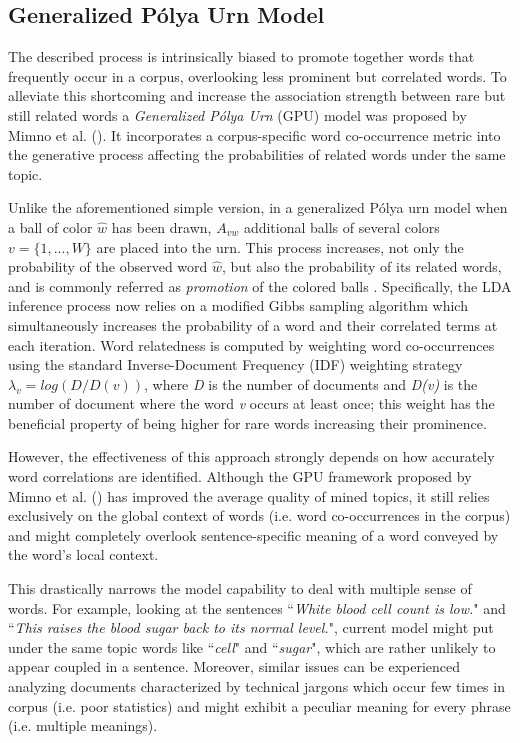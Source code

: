 \documentclass[letterpaper]{article}
\begin{document}
\subsection{Generalized P\'{o}lya Urn Model}
The described process is intrinsically biased to promote together words that frequently occur in a corpus, overlooking less prominent but correlated words. To alleviate this shortcoming and increase the association strength between rare but still related words a \textit{Generalized P\'{o}lya Urn} (GPU) model was proposed by  Mimno et al. (\citeyear{Mimno11}). It incorporates a corpus-specific word co-occurrence metric into the generative process affecting the probabilities of related words under the same topic.

Unlike the aforementioned simple version, in a generalized P\'{o}lya urn model when a ball of color $\hat{w}$ has been drawn, $A_{vw}$ additional balls of several colors $v=\{1,...,W\}$ are placed into the urn. This process increases, not only the probability of the observed word $\hat{w}$, but also the probability of its related words, and is commonly referred as \textit{promotion} of the colored balls \cite{Fei14}.
Specifically, the LDA inference process now relies on a modified Gibbs sampling algorithm which simultaneously increases the probability of a word and their correlated terms at each iteration. Word relatedness is computed by weighting word co-occurrences using the standard Inverse-Document Frequency (IDF) weighting strategy $\lambda_v = log(D/D(v))$, where \textit{D} is the number of documents and \textit{D(v)} is the number of document where the word \textit{v} occurs at least once; this weight has the beneficial property of being higher for rare words increasing their prominence.

However, the effectiveness of this approach strongly depends on how accurately word correlations are identified.
Although the GPU framework proposed by  Mimno et al. (\citeyear{Mimno11}) has improved the average quality of mined topics, it still relies exclusively on the global context of words (i.e. word co-occurrences in the corpus) and might completely overlook sentence-specific meaning of a word conveyed by the word's local context.

This drastically narrows the model capability to deal with multiple sense of words. For example, looking at the sentences ``\emph{White blood cell count is low.}" and ``\emph{This raises the blood sugar back to its normal level.}", current model might put under the same topic words like ``\emph{cell}" and ``\emph{sugar}", which are rather unlikely to appear coupled in a sentence. Moreover, similar issues can be experienced analyzing documents characterized by technical jargons which occur few times in corpus (i.e. poor statistics) and might exhibit a peculiar meaning for every phrase (i.e. multiple meanings).
\end{document}
